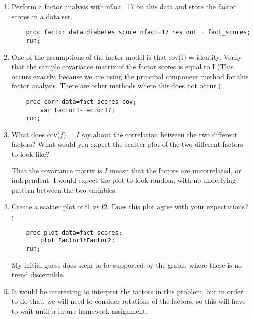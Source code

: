 \documentclass[11pt]{article}
\begin{document}
\begin{enumerate}
	\begin{enumerate}
	\item Perform a factor analysis with nfact=17 on this data and store 
		the factor scores in a data set.

\begin{Verbatim}
	proc factor data=diabetes score nfact=17 res out = fact_scores;
	run;
\end{Verbatim}
	

	\item One of the assumptions of the factor model is that 
		cov(f) = identity. Verify that the sample covariance matrix of 
		the factor scores is equal to I (This occurs exactly, because 
		we are using the principal component method for this factor 
		analysis. There are other methods where this does not occur.)

\begin{Verbatim}
	proc corr data=fact_scores cov;
		var Factor1-Factor17;
	run;
\end{Verbatim}
	

	\item What does cov($f$) = $I$ say about the correlation between the two 
		different factors? What would you expect the scatter plot of 
		the two different factors to look like?

		That the covariance matrix is $I$ measn that the factors are 
		uncorrelated, or independent. 
		I would expect the plot to look random, with no underlying pattern between 
		the two variables. 
		

	\item Create a scatter plot of f1 vs f2. Does this plot agree with 
		your expectations? ;

\begin{Verbatim}
	proc plot data=fact_scores;
		plot Factor1*Factor2;
	run;
\end{Verbatim}

	
	My initial guess does seem to be supported by the graph, where there 
	is no trend discernible. 

	\item It would be interesting to interpret the factors in this 
		problem, but in order to do that, we will need to consider 
		rotations of the factors, so this will have to wait until a 
		future homework assignment. 

	\end{enumerate}
\end{enumerate}
\end{document}

